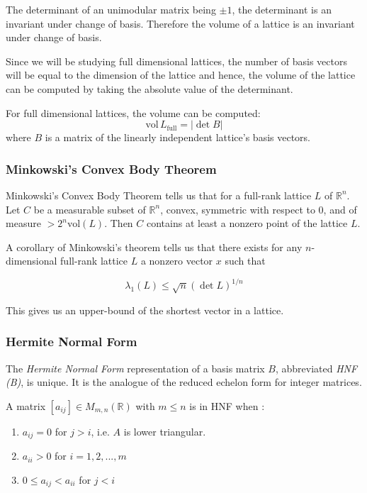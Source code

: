 \documentclass[10pt]{article}
\begin{document}
The determinant of an unimodular matrix being $\pm 1$, the determinant is an invariant under change of basis. Therefore the volume of a lattice is an invariant under change of basis.

Since we will be studying full dimensional lattices, the number of basis vectors will be equal to the dimension of the lattice and hence, the volume of the lattice can be computed by taking the absolute value of the determinant.

For full dimensional lattices, the volume can be computed:
\[
\text{vol} \,L_{\text{full}} = |\det B|
\] where $B$ is a matrix of the linearly independent lattice's basis vectors.


\subsubsection{Minkowski's Convex Body Theorem}

Minkowski's Convex Body Theorem tells us that for a full-rank lattice $L$ of $\mathbb{R}^n$. Let $C$ be a measurable subset of $\mathbb{R}^n$, convex, symmetric with respect to 0, and of measure $> 2^n \text{vol}(L)$. Then $C$ contains at least a nonzero point of the lattice $L$.

A corollary of Minkowski's theorem tells us that there exists for any $n$-dimensional full-rank lattice $L$ a nonzero vector $x$ such that

\[
\lambda_1(L) \leq \sqrt{n} (\det L)^{1/n}
\]

This gives us an upper-bound of the shortest vector in a lattice.

\subsubsection{Hermite Normal Form}

The \emph{Hermite Normal Form} representation of a basis matrix $B$, abbreviated \emph{HNF (B)}, is unique. It is the analogue of the reduced echelon form for integer matrices.

A matrix $[a_{ij}] \in M_{m,n} (\mathbb{R})$ with $m \leq n$ is in HNF when\cite{SchnorrStanfordNotes} :
\begin{enumerate}
\item $a_{ij} = 0$ for $j > i$, i.e. $A$ is lower triangular. 
\item $a_{ii} > 0$ for $i=1,2,...,m$
\item $0 \leq a_{ij} < a_{ii}$ for $j < i$
\end{enumerate}
\end{document}
